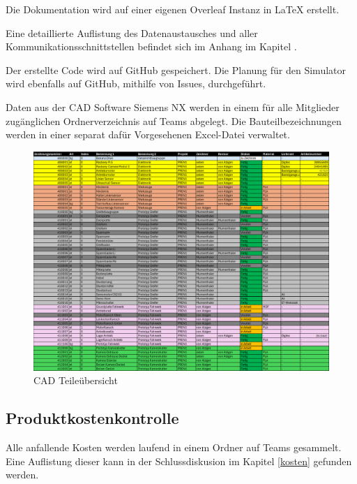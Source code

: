 Die Dokumentation wird auf einer eigenen Overleaf Instanz in LaTeX erstellt.

Eine detaillierte Auflistung des Datenaustausches und aller Kommunikationsschnittstellen befindet sich im Anhang im Kapitel .

Der erstellte Code wird auf GitHub gespeichert. Die Planung für den Simulator wird ebenfalls auf GitHub, mithilfe von Issues, durchgeführt. 

Daten aus der CAD Software Siemens NX werden in einem für alle Mitglieder zugänglichen Ordnerverzeichnis auf Teams abgelegt. Die Bauteilbezeichnungen werden in einer separat dafür Vorgesehenen Excel-Datei verwaltet. 

\begin{figure}[H]
\centering
\includegraphics[width=\textwidth]{img/00_Teileuebersicht.pdf}
\caption{CAD Teileübersicht}
\label{CAD-Teileuebersicht}
\end{figure}


\subsection{Produktkostenkontrolle}

Alle anfallende Kosten werden laufend in einem Ordner auf Teams gesammelt. Eine Auflistung dieser kann in der Schlussdiskusion im Kapitel \ref{kosten} gefunden werden.

